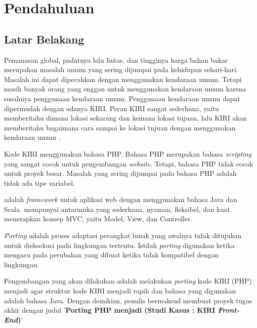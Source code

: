 \chapter{Pendahuluan}
\label{chap:pendahuluan}

\section{Latar Belakang}
\label{sec:latarbelakang}

Pemanasan global, padatnya lalu lintas, dan tingginya harga bahan bakar merupakan masalah umum yang sering dijumpai pada kehidupan sehari-hari. Masalah ini dapat dipecahkan dengan menggunakan kendaraan umum. Tetapi masih banyak orang yang enggan untuk menggunakan kendaraan umum karena susahnya penggunaan kendaraan umum. Penggunaan kendaraan umum dapat dipermudah dengan adanya KIRI. Peran KIRI sangat sederhana, yaitu memberitahu dimana lokasi sekarang dan kemana lokasi tujuan, lalu KIRI akan memberitahu bagaimana cara sampai ke lokasi tujuan dengan menggunakan kendaraan umum \cite{statickiri}. 

Kode KIRI menggunakan bahasa PHP. Bahasa PHP \cite{phpnet} merupakan bahasa \textit{scripting} yang sangat cocok untuk pengembangan \textit{website}. Tetapi, bahasa PHP tidak cocok untuk proyek besar. Masalah yang sering dijumpai pada bahasa PHP adalah tidak ada tipe variabel. 

\play adalah \textit{framework} untuk aplikasi web dengan menggunakan bahasa Java dan Scala. \play mempunyai antarmuka yang sederhana, nyaman, fleksibel, dan kuat. \play menerapkan konsep MVC, yaitu Model, View, dan Controller\cite{playforjava}. 

\textit{Porting} \cite{porting} adalah proses adaptasi perangkat lunak yang awalnya tidak ditujukan untuk dieksekusi pada lingkungan tertentu. Istilah \textit{porting} digunakan ketika mengacu pada perubahan yang dibuat ketika tidak kompatibel dengan lingkungan.

Pengembangan yang akan dilakukan adalah melakukan \textit{porting} kode KIRI (PHP) menjadi \play agar struktur kode KIRI menjadi rapih dan bahasa yang digunakan adalah bahasa Java. Dengan demikian, penulis bermaksud membuat proyek tugas akhir dengan judul '\textbf{Porting PHP menjadi \play (Studi Kasus : KIRI \textit{Front-End})}'

